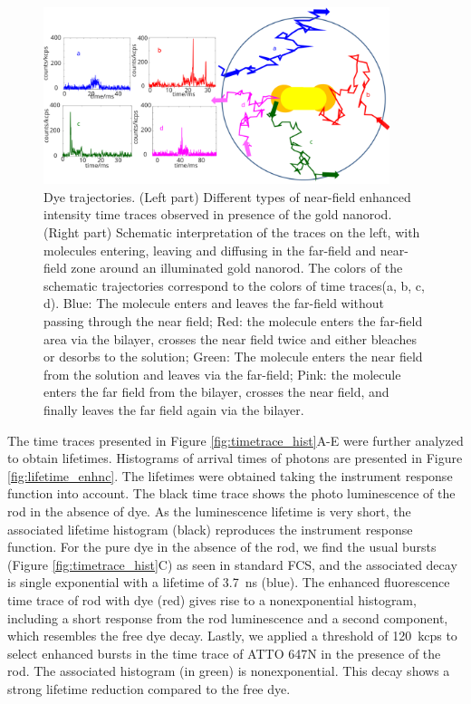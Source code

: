 \begin{figure}
	\centering
	\includegraphics[width=0.9\textwidth]{enhnc_trajectories}
	\caption{Dye trajectories. (Left part) Different types of near-field enhanced intensity time traces observed in presence of the gold nanorod.
	(Right part) Schematic interpretation of the traces on the left, with molecules entering, leaving and diffusing in the far-field and near-field zone around an illuminated gold nanorod. 
	The colors of the schematic trajectories correspond to the colors of time traces(a, b, c, d).
	Blue: The molecule enters and leaves the far-field without passing through the near field; Red: the molecule enters the far-field area via the bilayer, crosses the near field twice and either bleaches or desorbs to the solution; Green: The molecule enters the near field from the solution and leaves via the far-field; Pink: the molecule enters the far field from the bilayer, crosses the near field, and finally leaves the far field again via the bilayer.}
	\label{fig:enhnc_trajectories}
\end{figure}


The time traces presented in Figure \ref{fig:timetrace_hist}A-E were further analyzed to obtain lifetimes. 
Histograms of arrival times of photons are presented in Figure \ref{fig:lifetime_enhnc}.
The lifetimes were obtained taking the instrument response function into account.
The black time trace shows the photo luminescence of the rod in the absence of dye.
As the luminescence lifetime is very short, the associated lifetime histogram (black) reproduces the instrument response function.
For the pure dye in the absence of the rod, we find the usual bursts (Figure \ref{fig:timetrace_hist}C) as seen in standard FCS, and the associated decay is single exponential with a lifetime of \SI{3.7}{\ns} (blue).
The enhanced fluorescence time trace of rod with dye (red) gives rise to a nonexponential histogram, including a short response from the rod luminescence and a second component, which resembles the free dye decay.
Lastly, we applied a threshold of \SI{120}{kcps} to select enhanced bursts in the time trace of ATTO 647N in the presence of the rod.
The associated histogram (in green) is nonexponential.
This decay shows a strong lifetime reduction compared to the free dye.

